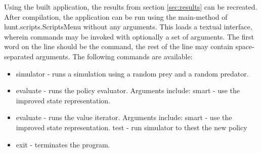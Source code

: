 Using the built application, the results from section \ref{sec:results} can be recreated. After compilation, the application can be run using the main-method of hunt.scripts.ScriptsMenu without any arguments. This loads a textual interface, wherein commands may be invoked with optionally a set of arguments. The first word on the line should be the command, the rest of the line may contain space-separated arguments. The following commands are available:

\begin{itemize}
  \item simulator - runs a simulation using a random prey and a random predator.
  \item evaluate - runs the policy evaluator. Arguments include:
    \subitem smart - use the improved state representation.
  \item evaluate - runs the value iterator. Arguments include:
    \subitem smart - use the improved state representation.
     \subitem test - run simulator to thest the new policy
  \item exit - terminates the program.
\end{itemize}